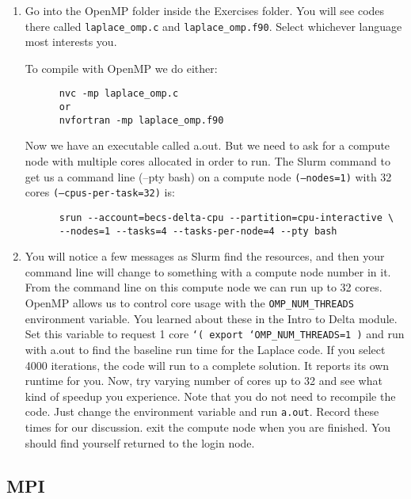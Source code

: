 \documentclass[11pt]{article}
\begin{document}
\begin{enumerate}
  \item{Go into the OpenMP folder inside the Exercises folder. You will see codes there called \texttt{laplace\_omp.c} and \texttt{laplace\_omp.f90}. Select whichever language most interests you.
  
  To compile with OpenMP we do either:
    \begin{verbatim}
      nvc -mp laplace_omp.c
      or
      nvfortran -mp laplace_omp.f90
    \end{verbatim}
    
  Now we have an executable called a.out. But we need to ask for a compute node with multiple cores allocated in order to run. The Slurm command to get us a command line (--pty bash) on a compute node \texttt{(--nodes=1)} with 32 cores \texttt{(--cpus-per-task=32)} is:
    \begin{verbatim}
      srun --account=becs-delta-cpu --partition=cpu-interactive \
      --nodes=1 --tasks=4 --tasks-per-node=4 --pty bash
    \end{verbatim}
  }

  \item {You will notice a few messages as Slurm find the resources, and then your command line will change to something with a compute node number in it. From the command line on this compute node we can run up to 32 cores. OpenMP allows us to control core usage with the \texttt{OMP\_NUM\_THREADS} environment variable. You learned about these in the Intro to Delta module. Set this variable to request 1 core \texttt{`( export `OMP\_NUM\_THREADS=1 )} and run with a.out to find the baseline run time for the Laplace code. If you select 4000 iterations, the code will run to a complete solution. It reports its own runtime for you. Now, try varying number of cores up to 32 and see what kind of speedup you experience. Note that you do not need to recompile the code. Just change the environment variable and run \texttt{a.out}. Record these times for our discussion. exit the compute node when you are finished. You should find yourself returned to the login node. }
\end{enumerate}

\subsection{MPI} 
\end{document}
